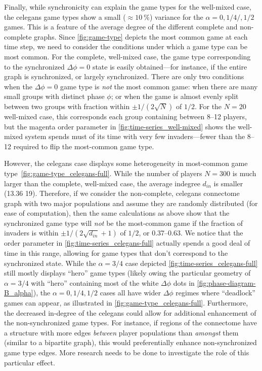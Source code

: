 \documentclass[pdflatex,lineno,referee,sn-mathphys-ay]{sn-jnl}
\begin{document}
Finally, while synchronicity can explain the game types
for the
 well-mixed case,
the
 \gls{celegans} game types
show a small ($\approx \SI{10}{\percent}$)
variance for the $\alpha = 0,1/4/,1/2$ games.
This is a feature of the average degree
of the different complete and non-complete graphs.
Since \cref{fig:game-type} depicts the most common game at each time step,
we need to consider the conditions under which a game type can be most common.
For the complete, well-mixed case, the game type corresponding
to the synchronized $\Delta \phi = 0$ state
is easily obtained---for instance, if the entire graph is synchronized,
or largely synchronized.
There are only two conditions when the $\Delta \phi = 0$ game type
is \emph{not} the most common game:
when there are many small groups with distinct phase $\phi$;
or when the game is almost evenly split between two groups
with fraction within $\pm 1/(2 \sqrt{N})$ of $1/2$.
For the $N = 20$ well-mixed case, this corresponds
each group containing between \numrange{8}{12} players,
but the magenta order parameter in \cref{fig:time-series_well-mixed}
shows the well-mixed system spends must of its time with very few invaders---fewer
than the \numrange{8}{12} required to flip the most-common game type.

However, the \gls{celegans} case displays some heterogeneity
in most-common game type~\cref{fig:game-type_celegans-full}.
While the number of players $N = 300$ is much larger
than the complete, well-mixed case,
the average indegree $d_{in}$ is smaller (\num{13.36} \vs \num{19}).
Therefore, if we consider the non-complete, \gls{celegans} connectome graph
with two major populations
and assume they are randomly distributed (for ease of computation),
then the same calculations as above show that
the synchronized game type will \emph{not} be the most-common game
if the fraction of invaders is within $\pm 1/(2 \sqrt{d_{in}} + 1)$
of $1/2$, or \numrange{0.37}{0.63}.
We notice that the order parameter in \cref{fig:time-series_celegans-full}
actually spends a good deal of time in this range,
allowing for game types that don't correspond to the synchronized state.
While the $\alpha = 3/4$ case depicted \cref{fig:time-series_celegans-full}
still mostly displays ``hero'' game types
(likely owing the particular geometry of $\alpha = 3/4$
with ``hero'' containing most of the white $\Delta \phi$ dots
in \cref{fig:phase-diagram-B_alpha}),
the $\alpha = 0, 1/4, 1/2$ cases all have wider $\Delta \phi$ regimes where
``deadlock'' games can appear, as illustrated in \cref{fig:game-type_celegans-full}.
Furthermore, the decreased in-degree of the \gls{celegans} could allow
for additional enhancement of the non-synchronized game types.
For instance, if regions of the connectome have a structure with more edges
\emph{between} player populations than \emph{amongst} them
(similar to a bipartite graph),
this would preferentially enhance non-synchronized game type edges.
More research needs to be done to investigate the role of this particular effect.
\end{document}
